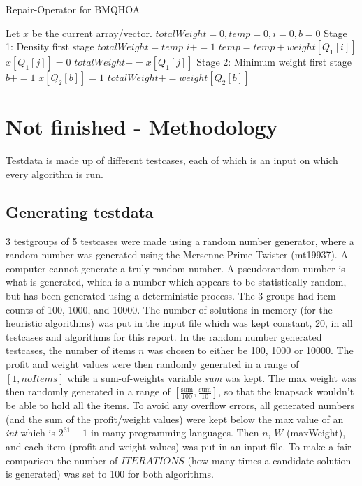 \documentclass[titlepage]{article}
\begin{document}
\begin{breakablealgorithm}
\caption{Repair-Operator for BMQHOA}\label{harmonicRepair}
    \begin{algorithmic}
        \State Let $x$ be the current array/vector.
        \State $totalWeight = 0, temp = 0, i = 0, b = 0$
        \State Stage 1: Density first stage
            \State $totalWeight = temp$
            \State $i += 1$
            \State $temp = temp + weight[Q_{1}[i]]$
        \EndWhile
            \State $x[Q_{1}[j]] = 0$
            \State $totalWeight += x[Q_{1}[j]]$
        \EndFor
        \State Stage 2: Minimum weight first stage
            \State $b += 1$
                    \State $x[Q_{2}[b]] = 1$
                \State $totalWeight += weight[Q_{2}[b]]$
            \EndIf
        \EndWhile
    \end{algorithmic}
\end{breakablealgorithm}

\newpage

\section{Not finished - Methodology}

Testdata is made up of different testcases, each of which is an input on which every algorithm is run.

\subsection{Generating testdata}

3 testgroups of 5 testcases were made using a random number generator, where a random number was generated using the Mersenne Prime Twister (mt19937). A computer cannot generate a truly random number. A pseudorandom number is what is generated, which is a number which appears to be statistically random, but has been generated using a deterministic process. The 3 groups had item counts of 100, 1000, and 10000. The number of solutions in memory (for the heuristic algorithms) was put in the input file which was kept constant, 20, in all testcases and algorithms for this report. In the random number generated testcases, the number of items $n$ was chosen to either be 100, 1000 or 10000. The profit and weight values were then randomly generated in a range of $ [1, noItems] $ while a sum-of-weights variable \emph{sum} was kept. The max weight was then randomly generated in a range of $[\frac{\text{sum}}{100} , \frac{\text{sum}}{10}]$, so that the knapsack wouldn't be able to hold all the items. To avoid any overflow errors, all generated numbers (and the sum of the profit/weight values) were kept below the max value of an \emph{int} which is $2^{31}-1$ in many programming languages.  Then $n$, $W$ (maxWeight), and each item (profit and weight values) was put in an input file. To make a fair comparison the number of $ITERATIONS$ (how many times a candidate solution is generated) was set to 100 for both algorithms. 
\end{document}
